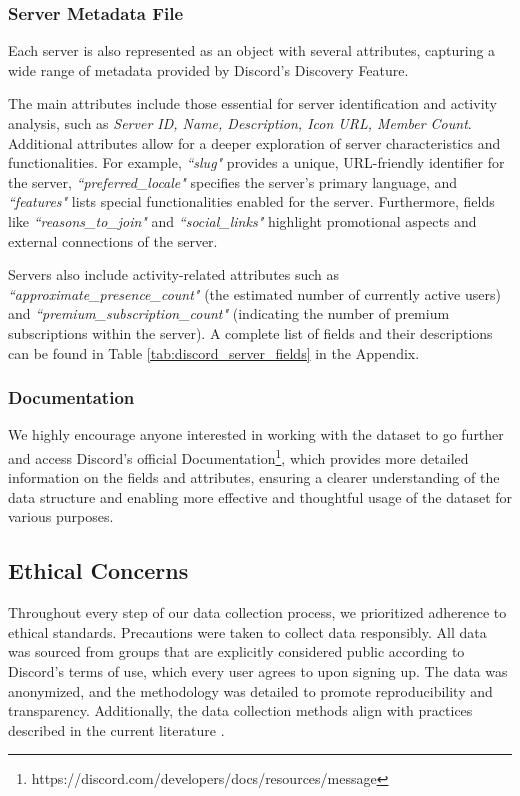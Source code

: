 \subsubsection{Server Metadata File}

Each server is also represented as an object with several attributes, capturing a wide range of metadata provided by Discord's Discovery Feature.

The main attributes include those essential for server identification and activity analysis, such as \textit{Server ID, Name, Description, Icon URL, Member Count}. Additional attributes allow for a deeper exploration of server characteristics and functionalities. For example, \textit{``slug"} provides a unique, URL-friendly identifier for the server, \textit{``preferred\_locale"} specifies the server's primary language, and \textit{``features"} lists special functionalities enabled for the server. Furthermore, fields like \textit{``reasons\_to\_join"} and \textit{``social\_links"} highlight promotional aspects and external connections of the server. 

Servers also include activity-related attributes such as \textit{``approximate\_presence\_count"} (the estimated number of currently active users) and \textit{``premium\_subscription\_count"} (indicating the number of premium subscriptions within the server). 
A complete list of fields and their descriptions can be found in Table \ref{tab:discord_server_fields} in the Appendix.

\subsubsection{Documentation} 

We highly encourage anyone interested in working with the dataset to go further and access Discord's official Documentation\footnote{https://discord.com/developers/docs/resources/message}, which provides more detailed information on the fields and attributes, ensuring a clearer understanding of the data structure and enabling more effective and thoughtful usage of the dataset for various purposes.

\subsection{Ethical Concerns}

Throughout every step of our data collection process, we prioritized adherence to ethical standards. Precautions were taken to collect data responsibly. All data was sourced from groups that are explicitly considered public according to Discord's terms of use, which every user agrees to upon signing up. The data was anonymized, and the methodology was detailed to promote reproducibility and transparency. Additionally, the data collection methods align with practices described in the current literature \cite{webmedia, Singh_Ghafouri_Such_Suarez-Tangil_2024, hateful_messages_adolescents}.

